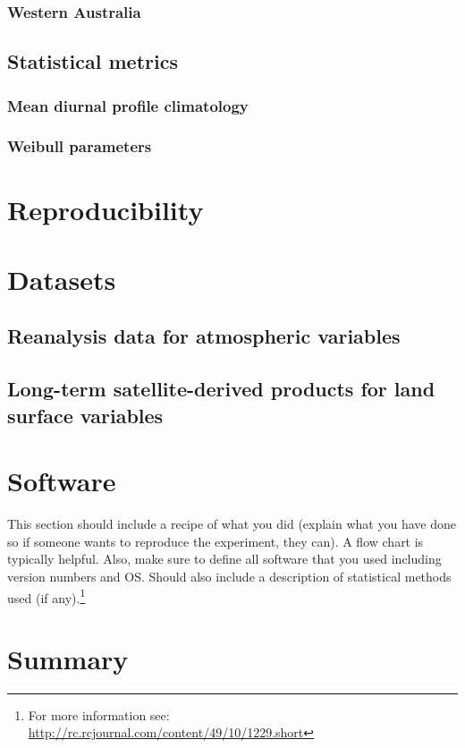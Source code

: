 \subsubsection{Western Australia}

\subsection{Statistical metrics}

\subsubsection{Mean diurnal profile climatology}

\subsubsection{Weibull parameters}

\section{Reproducibility}

\section{Datasets}

\subsection{Reanalysis data for atmospheric variables}

\subsection{Long-term satellite-derived products for land surface variables}

\section{Software}

This section should include a recipe of what you did (explain what you have done so if someone wants to reproduce the experiment, they can).  A flow chart is typically helpful.  Also, make sure to define all software that you used including version numbers and OS.  Should also include a description of statistical methods used (if any).\footnote{For more information see: \url{http://rc.rcjournal.com/content/49/10/1229.short}}

\blindtext

\section*{Summary}
\blindtext